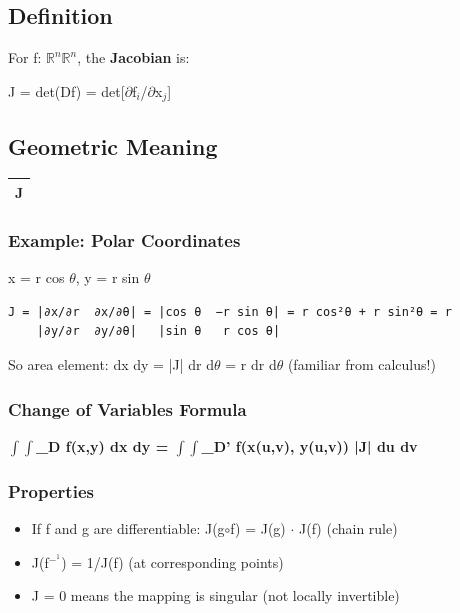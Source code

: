 \documentclass[12pt,a4paper,openany]{book}
\begin{document}
{{\subsection{Definition}

For f: $\mathbb{R}^n\mathbb{R}^n$, the \textbf{Jacobian} is:

J = det(Df) = det[$\partial$f$_i$/$\partial$x$_j$]

\subsection{Geometric Meaning}
\begin{center}
\begin{tabular}{|l|}
\hline
\textbf{J} \\
\hline
\end{tabular}
\end{center}

\subsubsection{Example: Polar Coordinates}
x = r cos $\theta$, y = r sin $\theta$

\begin{verbatim}
J = |∂x/∂r  ∂x/∂θ| = |cos θ  −r sin θ| = r cos²θ + r sin²θ = r
    |∂y/∂r  ∂y/∂θ|   |sin θ   r cos θ|
\end{verbatim}

So area element: dx dy = |J| dr d$\theta$ = r dr d$\theta$ (familiar from calculus!)

\subsubsection{Change of Variables Formula}

\textbf{$\int\int$_D f(x,y) dx dy = $\int\int$_D' f(x(u,v), y(u,v)) |J| du dv}

\subsubsection{Properties}
\begin{itemize}
  \item If f and g are differentiable: J(g$\circ$f) = J(g) $\cdot$ J(f) (chain rule)
  \item J(f$^{-}^1$) = 1/J(f) (at corresponding points)
  \item J = 0 means the mapping is singular (not locally invertible)
\end{itemize}

}}
\end{document}
